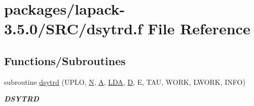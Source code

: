 \hypertarget{dsytrd_8f}{}\section{packages/lapack-\/3.5.0/\+S\+R\+C/dsytrd.f File Reference}
\label{dsytrd_8f}
\subsection*{Functions/\+Subroutines}
\begin{DoxyCompactItemize}
\item 
subroutine \hyperlink{group__doubleSYcomputational_gaefcd0b153f8e0c36b510af4364a12cd2}{dsytrd} (U\+P\+L\+O, \hyperlink{polmisc_8c_a0240ac851181b84ac374872dc5434ee4}{N}, \hyperlink{classA}{A}, \hyperlink{example__user_8c_ae946da542ce0db94dced19b2ecefd1aa}{L\+D\+A}, \hyperlink{odrpack_8h_a7dae6ea403d00f3687f24a874e67d139}{D}, E, T\+A\+U, W\+O\+R\+K, L\+W\+O\+R\+K, I\+N\+F\+O)
\begin{DoxyCompactList}\small\item\em {\bfseries D\+S\+Y\+T\+R\+D} \end{DoxyCompactList}\end{DoxyCompactItemize}
